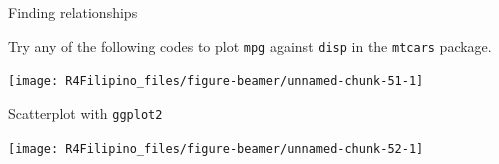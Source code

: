 \begin{frame}[fragile]{Finding relationships}

Try any of the following codes to plot \texttt{mpg} against
\texttt{disp} in the \texttt{mtcars} package.

\begin{Shaded}
\begin{Highlighting}[]
\OperatorTok{~}
\end{Highlighting}
\end{Shaded}

\begin{Shaded}
\begin{Highlighting}[]
\OperatorTok{$}\OperatorTok{$}
\end{Highlighting}
\end{Shaded}

\begin{Shaded}
\begin{Highlighting}[]
\end{Highlighting}
\end{Shaded}

\begin{center}\texttt{[image: R4Filipino\_files/figure-beamer/unnamed-chunk-51-1]} \end{center}

\end{frame}

\begin{frame}[fragile]{Scatterplot with \texttt{ggplot2}}

\begin{Shaded}
\begin{Highlighting}[]
\NormalTok{(}\OperatorTok{+}\StringTok{ }\NormalTok{()}
\end{Highlighting}
\end{Shaded}

\begin{center}\texttt{[image: R4Filipino\_files/figure-beamer/unnamed-chunk-52-1]} \end{center}

\end{frame}

